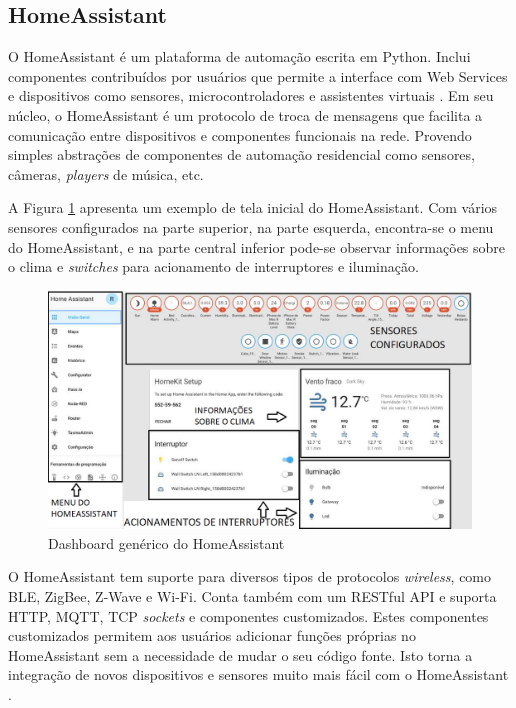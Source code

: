 \subsection{HomeAssistant}

O HomeAssistant é um plataforma de automação escrita em Python. Inclui componentes contribuídos por usuários que permite a interface com Web Services e dispositivos como sensores, microcontroladores e assistentes virtuais \cite{Lundrigan2017}. Em seu núcleo, o HomeAssistant é um protocolo de troca de mensagens que facilita a comunicação entre dispositivos e componentes funcionais na rede. Provendo simples abstrações de componentes de automação residencial como sensores, câmeras, \textit{players} de música, etc.

A Figura \ref{fig:homeassistant-dash} apresenta um exemplo de tela inicial do HomeAssistant. Com vários sensores configurados na parte superior, na parte esquerda, encontra-se o menu do HomeAssistant, e na parte central inferior pode-se observar informações sobre o clima e \textit{switches} para acionamento de interruptores e iluminação.

\begin{figure}[htbp]
	\centering
	\includegraphics[width=1\linewidth]{figuras/homeassistant-dash.png}
	\caption{Dashboard genérico do HomeAssistant}
	\label{fig:homeassistant-dash}
\end{figure}

O HomeAssistant tem suporte para diversos tipos de protocolos \textit{wireless}, como BLE, ZigBee, Z-Wave e Wi-Fi. Conta também com um RESTful API e suporta HTTP, MQTT, TCP \textit{sockets} e componentes customizados. Estes componentes customizados permitem aos usuários adicionar funções próprias no HomeAssistant sem a necessidade de mudar o seu código fonte. Isto torna a integração de novos dispositivos e sensores muito mais fácil com o HomeAssistant \cite{Gomes2018}.


